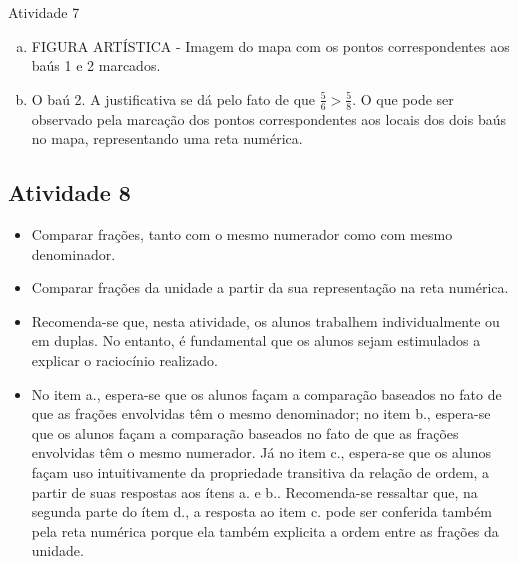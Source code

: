 \documentclass[oneside]{book}
\begin{document}
\begin{multicols}{2}
\begin{resposta*}{Atividade 7}
 \begin{enumerate}[a)]
 \item  \begin{imagem*}[breakable]{}{} FIGURA ARTÍSTICA - Imagem do mapa com os pontos correspondentes aos baús 1 e 2 marcados.\end{imagem*}
  \item  O baú 2. A justificativa se dá pelo fato de que  $\frac{5}{6} > \frac{5}{8}$. O que pode ser observado pela marcação dos pontos correspondentes aos locais dos dois baús no mapa, representando uma reta numérica.
\end{enumerate}
\end{resposta*}


\subsection{Atividade 8}

\begin{itemize} %
    \item       Comparar frações, tanto com o mesmo numerador como com mesmo denominador.
    \item       Comparar frações da unidade a partir da sua representação na reta numérica.
\end{itemize} %
  
      
\begin{itemize} %
    \item       Recomenda-se que, nesta atividade, os alunos trabalhem individualmente ou em duplas. No entanto, é fundamental que os alunos sejam estimulados a explicar o raciocínio realizado.
    \item       No item a., espera-se que os alunos façam a comparação baseados no fato de que as frações envolvidas têm o mesmo denominador; no item b., espera-se que os alunos façam a comparação baseados no fato de que as frações envolvidas têm o mesmo numerador. Já no item c., espera-se que os alunos façam uso intuitivamente da propriedade transitiva da relação de ordem, a partir de suas respostas aos ítens a. e b.. Recomenda-se ressaltar que, na segunda parte do ítem d., a resposta ao item c. pode ser conferida também pela reta numérica porque ela também explicita a ordem entre as frações da unidade.  
\end{itemize} %


\end{multicols}
\end{document}
